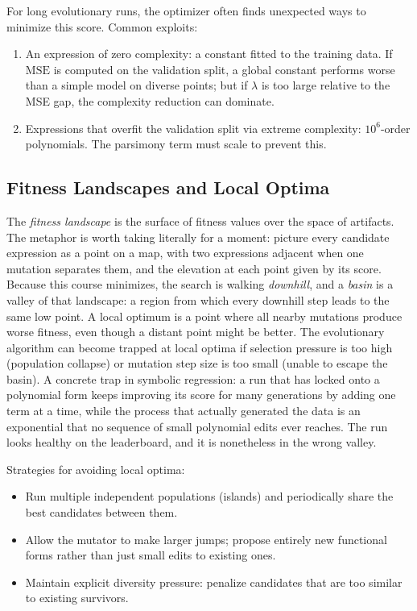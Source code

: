 For long evolutionary runs, the optimizer often finds unexpected ways to minimize this score.
Common exploits:
\begin{enumerate}
\item An expression of zero complexity: a constant fitted to the training data.
If $\mathrm{MSE}$ is computed on the validation split, a global constant performs worse than a simple model on diverse points; but if $\lambda$ is too large relative to the MSE gap, the complexity reduction can dominate.
\item Expressions that overfit the validation split via extreme complexity: $10^6$-order polynomials.
The parsimony term must scale to prevent this.
\end{enumerate}

\subsection{Fitness Landscapes and Local Optima}

The \emph{fitness landscape} is the surface of fitness values over the space of artifacts.
The metaphor is worth taking literally for a moment: picture every candidate expression as a point on a map, with two expressions adjacent when one mutation separates them, and the elevation at each point given by its score.
Because this course minimizes, the search is walking \emph{downhill}, and a \emph{basin} is a valley of that landscape: a region from which every downhill step leads to the same low point.
A local optimum is a point where all nearby mutations produce worse fitness, even though a distant point might be better.
The evolutionary algorithm can become trapped at local optima if selection pressure is too high (population collapse) or mutation step size is too small (unable to escape the basin).
A concrete trap in symbolic regression: a run that has locked onto a polynomial form keeps improving its score for many generations by adding one term at a time, while the process that actually generated the data is an exponential that no sequence of small polynomial edits ever reaches.
The run looks healthy on the leaderboard, and it is nonetheless in the wrong valley.

Strategies for avoiding local optima:
\begin{itemize}
\item Run multiple independent populations (islands) and periodically share the best candidates between them.
\item Allow the mutator to make larger jumps; propose entirely new functional forms rather than just small edits to existing ones.
\item Maintain explicit diversity pressure: penalize candidates that are too similar to existing survivors.
\end{itemize}

